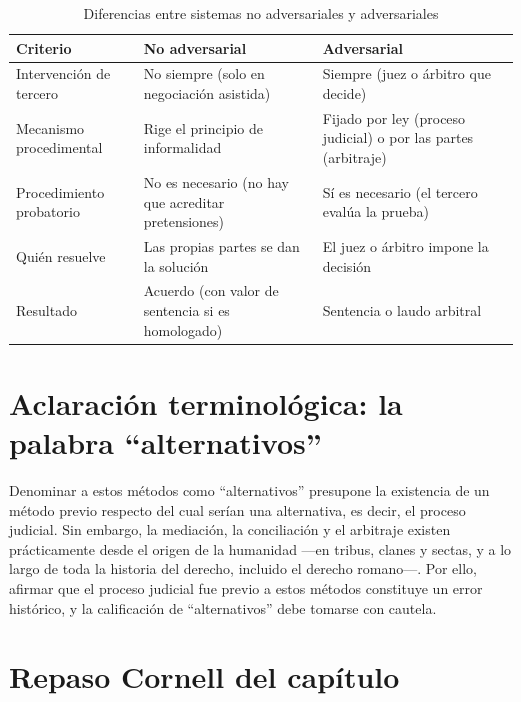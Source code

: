 \documentclass[12pt,oneside]{book}
\begin{document}
\begin{table}[H]
\centering
\caption{Diferencias entre sistemas no adversariales y adversariales}
\begin{tabularx}{\textwidth}{
    >{\raggedright\arraybackslash}p{}
    >{\raggedright\arraybackslash}X
    >{\raggedright\arraybackslash}X
}
\toprule
\textbf{Criterio} & \textbf{No adversarial} & \textbf{Adversarial} \\
\midrule
Intervención de tercero & No siempre (solo en negociación asistida) & Siempre (juez o árbitro que decide) \\
Mecanismo procedimental & Rige el principio de informalidad & Fijado por ley (proceso judicial) o por las partes (arbitraje) \\
Procedimiento probatorio & No es necesario (no hay que acreditar pretensiones) & Sí es necesario (el tercero evalúa la prueba) \\
Quién resuelve & Las propias partes se dan la solución & El juez o árbitro impone la decisión \\
Resultado & Acuerdo (con valor de sentencia si es homologado) & Sentencia o laudo arbitral \\
\bottomrule
\end{tabularx}
\end{table}

\section{Aclaración terminológica: la palabra ``alternativos''}

\begin{note}
Denominar a estos métodos como ``alternativos'' presupone la existencia de un método previo respecto del cual serían una alternativa, es decir, el proceso judicial. Sin embargo, la mediación, la conciliación y el arbitraje existen prácticamente desde el origen de la humanidad ---en tribus, clanes y sectas, y a lo largo de toda la historia del derecho, incluido el derecho romano---. Por ello, afirmar que el proceso judicial fue previo a estos métodos constituye un error histórico, y la calificación de ``alternativos'' debe tomarse con cautela.
\end{note}

\section*{Repaso Cornell del capítulo}
\end{document}
